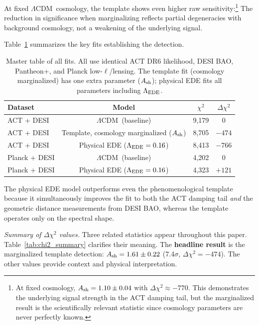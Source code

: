 \documentclass[onecolumn,showpacs,preprintnumbers,amsmath,amssymb,prd]{revtex4-2}
\newcommand{\lcdm}{$\Lambda$CDM}
\begin{document}
At fixed \lcdm\ cosmology, the template shows even higher raw 
sensitivity:\footnote{At fixed cosmology, $A_{\rm sh} = 1.10 \pm 0.04$ 
with $\Delta\chi^2 \approx -770$. This demonstrates the underlying 
signal strength in the ACT damping tail, but the marginalized 
result is the scientifically relevant statistic since cosmology 
parameters are never perfectly known.} The reduction in significance 
when marginalizing reflects partial degeneracies with background 
cosmology, not a weakening of the underlying signal.

Table~\ref{tab:master_fits} summarizes the key fits establishing the detection.

\begin{table}[h]
\centering
\caption{Master table of all fits. All use identical ACT DR6 likelihood, DESI BAO, 
Pantheon+, and Planck low-$\ell$/lensing. The template fit (cosmology marginalized) 
has one extra parameter ($A_{\rm sh}$); physical EDE fits all parameters including 
$\Lambda_{\rm EDE}$.}
\begin{tabular}{lccc}
\toprule
Dataset & Model & $\chi^2$ & $\Delta\chi^2$ \\
\midrule
ACT + DESI & \lcdm\ (baseline) & 9{,}179 & 0 \\
ACT + DESI & Template, cosmology marginalized ($A_{\rm sh}$) & 8{,}705 & $-474$ \\
ACT + DESI & Physical EDE ($\Lambda_{\rm EDE} = 0.16$) & 8{,}413 & $-766$ \\
Planck + DESI & \lcdm\ (baseline) & 4{,}202 & 0 \\
Planck + DESI & Physical EDE ($\Lambda_{\rm EDE} = 0.16$) & 4{,}323 & $+121$ \\
\bottomrule
\end{tabular}
\label{tab:master_fits}
\end{table}

The physical EDE model outperforms even the phenomenological template 
because it simultaneously improves the fit to both the ACT damping tail 
\emph{and} the geometric distance measurements from DESI BAO, whereas the 
template operates only on the spectral shape.

\emph{Summary of $\Delta\chi^2$ values.} Three related statistics appear throughout 
this paper. Table~\ref{tab:chi2_summary} clarifies their meaning. The \textbf{headline 
result} is the marginalized template detection: $A_{\rm sh} = 1.61 \pm 0.22$ (7.4$\sigma$, 
$\Delta\chi^2 = -474$). The other values provide context and physical interpretation.
\end{document}
